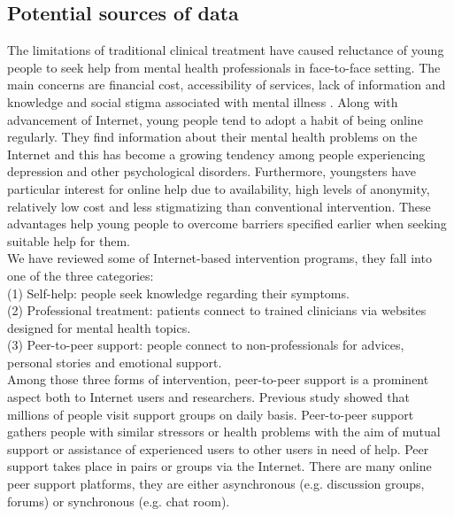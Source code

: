 \subsection*{Potential sources of data}
The limitations of traditional clinical treatment have caused reluctance of young people to seek help from mental health professionals in face-to-face setting. The main concerns are financial cost, accessibility of services, lack of information and knowledge and social stigma associated with mental illness \cite{Rickwood2005}. Along with advancement of Internet, young people tend to adopt a habit of being online regularly. They find information about their mental health problems on the Internet and this has become a growing tendency among people experiencing depression and other psychological disorders. Furthermore, youngsters have particular interest for online help due to availability, high levels of anonymity, relatively low cost and less stigmatizing than conventional intervention. These advantages help young people to overcome barriers specified earlier when seeking suitable help for them.\\
We have reviewed some of Internet-based intervention programs, they fall into one of the three categories: \\
(1) Self-help: people seek knowledge regarding their symptoms. \\
(2) Professional treatment: patients connect to trained clinicians via websites designed for mental health topics. \\
(3) Peer-to-peer support: people connect to non-professionals for advices, personal stories and emotional support.\\
Among those three forms of intervention, peer-to-peer support is a prominent aspect both to Internet users and researchers. Previous study showed that millions of people visit support groups on daily basis. Peer-to-peer support gathers people with similar stressors or health problems with the aim of mutual support or assistance of experienced users to other users in need of help. Peer support takes place in pairs or groups via the Internet. There are many online peer support platforms, they are either asynchronous (e.g. discussion groups, forums) or synchronous (e.g. chat room).\\
